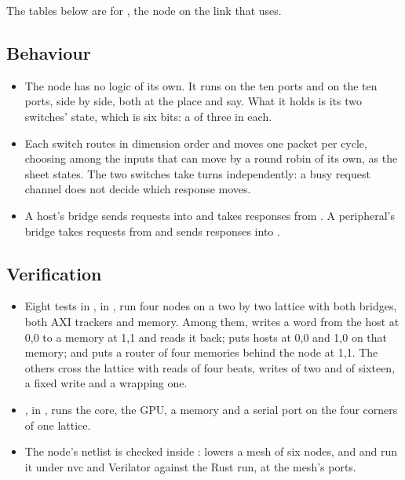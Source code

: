 The tables below are for , the node on
the link that  uses.


\subsection*{Behaviour}

\begin{itemize}
\item The node has no logic of its own. It runs  on the ten
 ports and  on the ten  ports, side by side,
both at the place  and  say. What it holds is its
two switches' state, which is six bits: a  of three in
each.
\item Each switch routes in dimension order and moves one packet per
cycle, choosing among the inputs that can move by a round robin of its
own, as the  sheet states. The two switches take turns
independently: a busy request channel does not decide which response
moves.
\item A host's bridge sends requests into  and takes
responses from . A peripheral's bridge takes requests from
 and sends responses into .
\end{itemize}

\subsection*{Verification}

\begin{itemize}
\item Eight tests in , in
, run four nodes on a two by two lattice
with both bridges, both AXI trackers and memory. Among them,
writes a word from the host at 0,0 to a memory at 1,1 and reads it
back; 
puts hosts at 0,0 and 1,0 on that memory; and
 puts a router of four
memories behind the node at 1,1. The others cross the lattice with
reads of four beats, writes of two and of sixteen, a fixed write and a
wrapping one.
\item {}, in
, runs the core, the GPU, a memory and a serial
port on the four corners of one lattice.
\item The node's netlist is checked inside : 
lowers a mesh of six nodes, and 
and  run it under nvc and Verilator
against the Rust run, at the mesh's ports.
\end{itemize}

